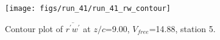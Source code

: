 \begin{figure}[H]
\centering
\texttt{[image: figs/run\_41/run\_41\_rw\_contour]}
\caption{Contour plot of $\overline{r^\prime w^\prime}$ at $z/c$=9.00, $V_{free}$=14.88, station 5.}
\label{fig:run_41_rw_contour}
\end{figure}


